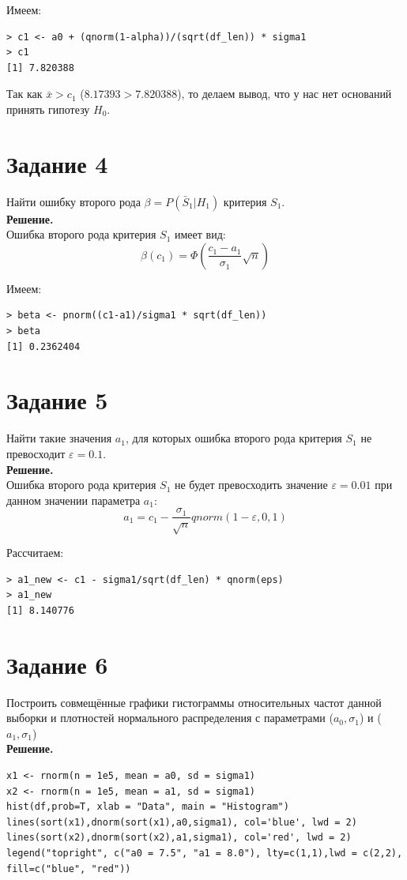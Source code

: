 \documentclass[14pt,a4paper]{scrartcl}
\begin{document}
Имеем:
\begin{verbatim}
> c1 <- a0 + (qnorm(1-alpha))/(sqrt(df_len)) * sigma1
> c1
[1] 7.820388
\end{verbatim}

Так как $\bar{x} > c_1$ ($8.17393 > 7.820388$), то делаем вывод, что у нас нет оснований принять гипотезу $H_0$.


\section*{Задание 4}
Найти ошибку второго рода  $\beta=P(\bar{S}_1|H_1 )$ критерия $S_1$.\\
\textbf{Решение.}\\
Ошибка второго рода критерия $S_1$ имеет вид:
\begin{equation*}
	\beta(c_1) = \Phi(\frac{c_1-a_1}{\sigma_1}\sqrt{n})
\end{equation*}

Имеем:
\begin{verbatim}
> beta <- pnorm((c1-a1)/sigma1 * sqrt(df_len))
> beta
[1] 0.2362404
\end{verbatim}

\section*{Задание 5}
Найти такие значения $a_1$, для которых ошибка второго рода  критерия $S_1$ не превосходит $\varepsilon=0.1$.\\
\textbf{Решение.}\\
Ошибка второго рода критерия $S_1$ не будет превосходить значение $\varepsilon = 0.01$ при данном значении параметра $a_1$:
\begin{equation*}
	a_1 = c_1 - \frac{\sigma_1}{\sqrt{n}}  qnorm(1-\varepsilon,0,1)
\end{equation*}

Рассчитаем:
\begin{verbatim}
> a1_new <- c1 - sigma1/sqrt(df_len) * qnorm(eps)
> a1_new
[1] 8.140776
\end{verbatim}

\section*{Задание 6}
Построить совмещённые графики гистограммы относительных частот данной выборки и плотностей нормального распределения с параметрами ($a_0,\sigma_1$) и ($a_1,\sigma_1$)\\
\textbf{Решение.}
\begin{verbatim}
x1 <- rnorm(n = 1e5, mean = a0, sd = sigma1)
x2 <- rnorm(n = 1e5, mean = a1, sd = sigma1)
hist(df,prob=T, xlab = "Data", main = "Histogram")
lines(sort(x1),dnorm(sort(x1),a0,sigma1), col='blue', lwd = 2)
lines(sort(x2),dnorm(sort(x2),a1,sigma1), col='red', lwd = 2)
legend("topright", c("a0 = 7.5", "a1 = 8.0"), lty=c(1,1),lwd = c(2,2),
fill=c("blue", "red"))
\end{verbatim}
\end{document}
